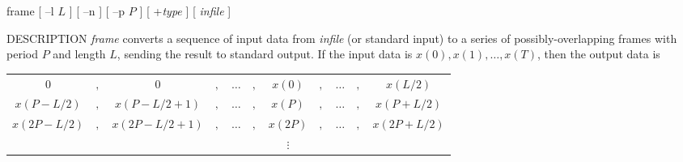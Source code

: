 % 
% 
% 
% 
%                                                                        
%
\hypertarget{frame}{}

\begin{synopsis}
 \item [frame] [ --l $L$ ] [ --n ] [ --p $P$ ] [ +{\em type} ] [ {\em infile} ]
\end{synopsis}

\begin{qsection}{DESCRIPTION}
{\em frame} converts a sequence of input data 
from {\em infile} (or standard input) 
to a series of possibly-overlapping frames with period $P$ and length $L$, 
sending the result to standard output.
If the input data is $x(0),x(1),\ldots,x(T)$, then the output data is
\begin{center}
\begin{tabular}{ccccccccccc}
$0$&$,$&$0$&$,$&$\ldots$&$,$&$x(0)$&$,$&$\ldots$&$,$&$x(L/2)$\\
$x(P-L/2)$&$,$&$x(P-L/2+1)$&$,$&$\ldots$&$,$&$x(P)$&$,$&$\ldots$&$,$&$x(P+L/2)$\\
$x(2P-L/2)$&$,$&$x(2P-L/2+1)$&$,$&$\ldots$&$,$&$x(2P)$&$,$&$\ldots$&$,$&$x(2P+L/2)$\\
&&&&&&$\vdots$&&&&
\end{tabular}
\end{center}

\end{qsection}


